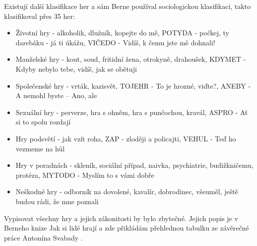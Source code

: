 Existují další klasifikace her a sám Berne používal sociologickou klasifikaci, takto klasifikoval přes 35 her:
    \begin{itemize}
        \item Životní hry - alkoholik, dlužník, kopejte do mě, POTYDA - počkej, ty darebáku - já ti úkážu, VIČEDO - Vidíš, k čemu jste mě dohnali!
        \item Manželské hry - kout, soud, fritidní žena, otrokyně, drahoušek, KDYMET - Kdyby nebylo tebe, vidíš, jak se obětuji
        \item Společenské hry - vrták, kazisvět, TOJEHR - To je hrozné, viďte?, ANEBY - A nemohl byste -- Ano, ale
        \item Sexuální hry - perverze, hra s ohněm, hra s punčochou, kravál, ASPRO - Ať si to spolu rozdají
        \item Hry podsvětí - jak vzít roha, ZAP - zloději a policajti, VEHUL - Teď ho vezmeme na hůl
        \item Hry v poradnách - skleník, sociální případ, naivka, psychiatrie, budižkničemu, protéza, MYTODO - Myslím to s vámi dobře
        \item Neškodné hry - odborník na dovolené, kavalír, dobrodinec, všeuměl, ještě budou rádi, že mne poznali
    \end{itemize}{}

Vypisovat všechny hry a jejich zákonitosti by bylo zbytečné. Jejich popis je v Berneho knize Jak si lidé hrají \cite{jak_si_lide_hraji} a zde přikládám přehlednou tabulku ze závěrečné práce Antonína Svabady \cite{svabada_tabulka}.\\

